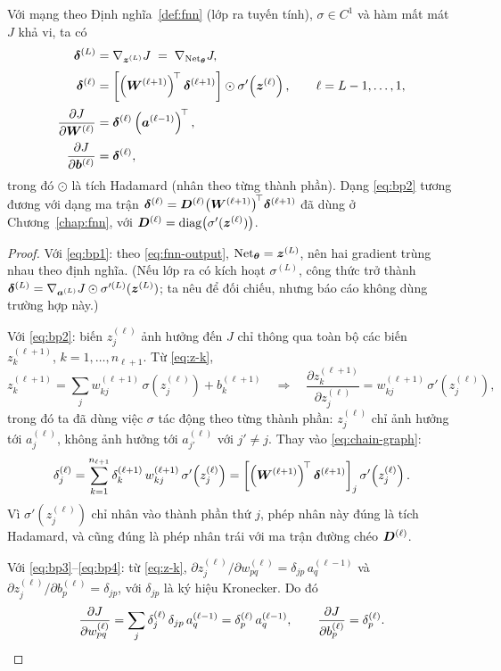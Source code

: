 \begin{menhde}
\label{md:bp}
Với mạng theo Định nghĩa~\ref{def:fnn} (lớp ra tuyến tính), $\sigma \in C^1$ và
hàm mất mát $J$ khả vi, ta có
\begin{align}
\bm{\delta}^{(L)} &= \nabla_{\bm{z}^{(L)}} J
  \;=\; \nabla_{\operatorname{Net}_{\bm{\theta}}} J,
\label{eq:bp1}\\[2pt]
\bm{\delta}^{(\ell)} &= \left[ \left(\bm{W}^{(\ell+1)}\right)^{\!\top}
  \bm{\delta}^{(\ell+1)} \right]
\odot \sigma'\!\left(\bm{z}^{(\ell)}\right),
\qquad \ell = L-1,\dots,1,
\label{eq:bp2}\\[2pt]
\frac{\partial J}{\partial \bm{W}^{(\ell)}}
  &= \bm{\delta}^{(\ell)} \left(\bm{a}^{(\ell-1)}\right)^{\!\top},
\label{eq:bp3}\\[2pt]
\frac{\partial J}{\partial \bm{b}^{(\ell)}} &= \bm{\delta}^{(\ell)},
\label{eq:bp4}
\end{align}
trong đó $\odot$ là tích Hadamard (nhân theo từng thành phần). Dạng
\eqref{eq:bp2} tương đương với dạng ma trận
$\bm{\delta}^{(\ell)} = \bm{D}^{(\ell)}\big(\bm{W}^{(\ell+1)}\big)^{\!\top}
\bm{\delta}^{(\ell+1)}$ đã dùng ở Chương~\ref{chap:fnn}, với
$\bm{D}^{(\ell)} = \operatorname{diag}\!\big(\sigma'(\bm{z}^{(\ell)})\big)$.
\end{menhde}
 
\begin{proof}
Với \eqref{eq:bp1}: theo \eqref{eq:fnn-output}, $\operatorname{Net}_{\bm{\theta}} = \bm{z}^{(L)}$,
nên hai gradient trùng nhau theo định nghĩa. (Nếu lớp ra có kích hoạt
$\sigma^{(L)}$, công thức trở thành
$\bm{\delta}^{(L)} = \nabla_{\bm{a}^{(L)}}J \odot \sigma'^{(L)}(\bm{z}^{(L)})$; ta nêu
để đối chiếu, nhưng báo cáo không dùng trường hợp này.)
 
Với \eqref{eq:bp2}: biến $z^{(\ell)}_j$ ảnh hưởng đến $J$ chỉ thông qua toàn bộ
các biến $z^{(\ell+1)}_k$, $k = 1,\dots,n_{\ell+1}$. Từ \eqref{eq:z-k},
\[
z^{(\ell+1)}_k = \sum_{j} w^{(\ell+1)}_{kj}\,
  \sigma\!\left(z^{(\ell)}_j\right) + b^{(\ell+1)}_k
\quad\Longrightarrow\quad
\frac{\partial z^{(\ell+1)}_k}{\partial z^{(\ell)}_j}
= w^{(\ell+1)}_{kj}\, \sigma'\!\left(z^{(\ell)}_j\right),
\]
trong đó ta đã dùng việc $\sigma$ tác động theo từng thành phần: $z^{(\ell)}_j$
chỉ ảnh hưởng tới $a^{(\ell)}_j$, không ảnh hưởng tới $a^{(\ell)}_{j'}$ với
$j'\ne j$. Thay vào \eqref{eq:chain-graph}:
\[
\delta^{(\ell)}_j
= \sum_{k=1}^{n_{\ell+1}} \delta^{(\ell+1)}_k\, w^{(\ell+1)}_{kj}\,
  \sigma'\!\left(z^{(\ell)}_j\right)
= \left[ \left(\bm{W}^{(\ell+1)}\right)^{\!\top}\bm{\delta}^{(\ell+1)} \right]_j
  \sigma'\!\left(z^{(\ell)}_j\right).
\]
Vì $\sigma'(z^{(\ell)}_j)$ chỉ nhân vào thành phần thứ $j$, phép nhân này đúng
là tích Hadamard, và cũng đúng là phép nhân trái với ma trận đường chéo
$\bm{D}^{(\ell)}$.
 
Với \eqref{eq:bp3}--\eqref{eq:bp4}: từ \eqref{eq:z-k},
$\partial z^{(\ell)}_j/\partial w^{(\ell)}_{pq} = \delta_{jp}\, a^{(\ell-1)}_q$
và $\partial z^{(\ell)}_j/\partial b^{(\ell)}_p = \delta_{jp}$, với $\delta_{jp}$
là ký hiệu Kronecker. Do đó
\[
\frac{\partial J}{\partial w^{(\ell)}_{pq}}
= \sum_j \delta^{(\ell)}_j\, \delta_{jp}\, a^{(\ell-1)}_q
= \delta^{(\ell)}_p\, a^{(\ell-1)}_q,
\qquad
\frac{\partial J}{\partial b^{(\ell)}_p} = \delta^{(\ell)}_p . \qedhere
\]
\end{proof}
 
